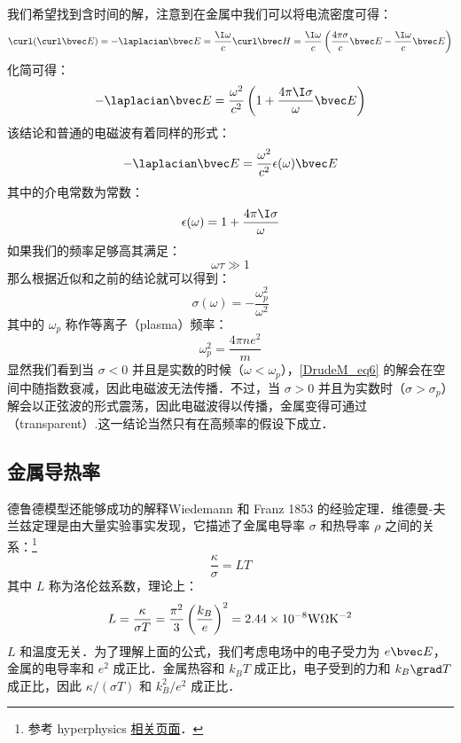 我们希望找到含时间的解，注意到在金属中我们可以将电流密度可得：
\begin{equation}
\curl(\curl\bvec E)=-\laplacian \bvec E =\frac{\I\omega}{c}\curl\bvec H=\frac{\I\omega}{c}\left(\frac{4\pi\sigma}{c}\bvec E-\frac{\I\omega}{c}\bvec E\right)
\end{equation}
化简可得：
\begin{equation}
-\laplacian \bvec E =\frac{\omega^2}{c^2}\left(1+\frac{4\pi\I\sigma}{\omega}\bvec E\right)
\end{equation}
该结论和普通的电磁波有着同样的形式：
\begin{equation}\label{DrudeM_eq6}
-\laplacian \bvec E = \frac{\omega^2}{c^2}\epsilon(\omega)\bvec E
\end{equation}
其中的介电常数为常数：
\begin{equation}
\epsilon(\omega)=1+\frac{4\pi\I\sigma}{\omega}
\end{equation}
如果我们的频率足够高其满足：
\begin{equation}
\omega\tau\gg 1
\end{equation}
那么根据近似和之前的结论就可以得到：
\begin{equation}
\sigma(\omega)=-\frac{\omega_p^2}{\omega^2}
\end{equation}
其中的 $\omega_p$ 称作等离子（plasma）频率：
\begin{equation}
\omega_p^2=\frac{4\pi ne^2}{m}
\end{equation}
显然我们看到当 $\sigma<0$ 并且是实数的时候（$\omega<\omega_p$），\autoref{DrudeM_eq6} 的解会在空间中随指数衰减，因此电磁波无法传播．不过，当 $\sigma>0$ 并且为实数时（$\sigma>\sigma_p$）解会以正弦波的形式震荡，因此电磁波得以传播，金属变得可通过（transparent）.这一结论当然只有在高频率的假设下成立．

\subsection{金属导热率}
德鲁德模型还能够成功的解释Wiedemann 和 Franz 1853 的经验定理．维德曼-夫兰兹定理是由大量实验事实发现，它描述了金属电导率 $\sigma$ 和热导率 $\rho$ 之间的关系：\footnote{参考 hyperphysics \href{http://hyperphysics.phy-astr.gsu.edu/hbase/thermo/thercond.html}{相关页面}．}
\begin{equation}
\frac{\kappa}{\sigma}=LT
\end{equation}
其中 $L$ 称为洛伦兹系数，理论上：
\begin{equation}\label{DrudeM_eq47}
L=\frac{\kappa}{\sigma T}=\frac{\pi^2}{3}\left(\frac{k_B}{e}\right)^2 = 2.44\times10^{-8}\rm{W\Omega K^{-2}}
\end{equation}
$L$ 和温度无关．为了理解上面的公式，我们考虑电场中的电子受力为 $e\bvec E$，金属的电导率和 $e^2$ 成正比．金属热容和 $k_B T$ 成正比，电子受到的力和 $k_B\grad T$ 成正比，因此 $\kappa/(\sigma T)$ 和 $k_B^2/e^2$ 成正比．

